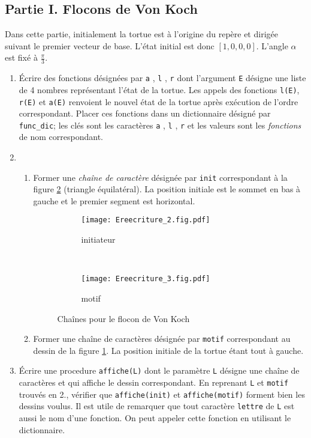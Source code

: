\subsection*{Partie I. Flocons de Von Koch}
Dans cette partie, initialement la tortue est à l'origine du repère et dirigée suivant le premier vecteur de base. L'état initial est donc $[1,0,0,0]$. L'angle $\alpha$ est fixé à $\frac{\pi}{3}$. 
\begin{enumerate}
\item
\'Ecrire des fonctions désignées par \verb|a| , \verb|l| , \verb|r| dont l'argument \verb|E| désigne une liste de 4 nombres représentant l'état de la tortue.\newline
Les appels des fonctions \verb|l(E)|, \verb|r(E)| et \verb|a(E)| renvoient le nouvel état de la tortue après exécution de l'ordre correspondant. Placer ces fonctions dans un dictionnaire désigné par \verb|func_dic|; les clés sont les caractères \verb|a| , \verb|l| , \verb|r| et les valeurs sont les \emph{fonctions} de nom correspondant. 

 \item \begin{enumerate}
\item Former une \emph{chaîne de caractère} désignée par \verb|init| correspondant à la figure \ref{fig:Ereecriture_2} (triangle équilatéral). La position initiale est le sommet en bas à gauche et le premier segment est horizontal.

\begin{figure}[ht]
 \centering
 \begin{subfigure}[b]{4cm}
   \texttt{[image: Ereecriture\_2.fig.pdf]}
   \caption{initiateur}  
 \end{subfigure} ~
 \begin{subfigure}[b]{4cm}
   \texttt{[image: Ereecriture\_3.fig.pdf]}
   \caption{motif}\label{fig:Ereecriture_3} 
  \end{subfigure}
  \caption{Chaînes pour le flocon de Von Koch} \label{fig:Ereecriture_2}
\end{figure}

\item Former une chaîne de caractères désignée par \verb|motif| correspondant au dessin de la figure \ref{fig:Ereecriture_3}. La position initiale de la tortue étant tout à gauche.
\end{enumerate}

\item \'Ecrire une procedure \verb|affiche(L)| dont le paramètre \verb|L| désigne une chaîne de caractères et qui affiche le dessin correspondant. En reprenant \verb|L| et \verb|motif| trouvés en  2., vérifier que \verb|affiche(init)| et \verb|affiche(motif)| forment bien les dessins voulus. Il est utile de remarquer que tout caractère \verb|lettre| de \verb|L| est aussi le nom d'une fonction. On peut appeler cette fonction en utilisant le dictionnaire.


\end{enumerate}
